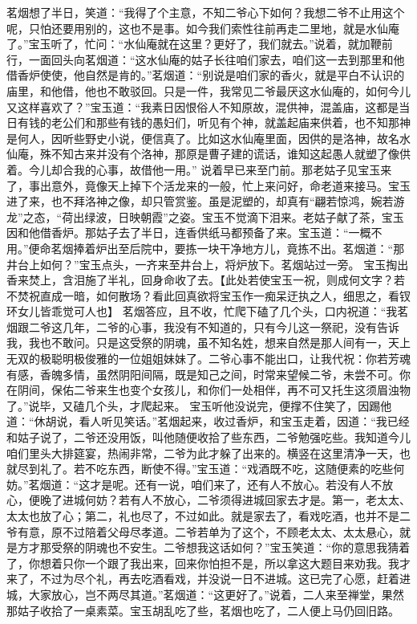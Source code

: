 \documentclass[12pt,oneside]{book}
\begin{document}
茗烟想了半日，笑道：“我得了个主意，不知二爷心下如何？我想二爷不止用这个呢，只怕还要用别的，这也不是事。如今我们索性往前再走二里地，就是水仙庵了。”宝玉听了，忙问：“水仙庵就在这里？更好了，我们就去。”说着，就加鞭前行，一面回头向茗烟道：“这水仙庵的姑子长往咱们家去，咱们这一去到那里和他借香炉使使，他自然是肯的。”茗烟道：“别说是咱们家的香火，就是平白不认识的庙里，和他借，他也不敢驳回。只是一件，我常见二爷最厌这水仙庵的，如何今儿又这样喜欢了？”宝玉道：“我素日因恨俗人不知原故，混供神，混盖庙，这都是当日有钱的老公们和那些有钱的愚妇们，听见有个神，就盖起庙来供着，也不知那神是何人，因听些野史小说，便信真了。比如这水仙庵里面，因供的是洛神，故名水仙庵，殊不知古来并没有个洛神，那原是曹子建的谎话，谁知这起愚人就塑了像供着。今儿却合我的心事，故借他一用。”
说着早已来至门前。那老姑子见宝玉来了，事出意外，竟像天上掉下个活龙来的一般，忙上来问好，命老道来接马。宝玉进了来，也不拜洛神之像，却只管赏鉴。虽是泥塑的，却真有“翩若惊鸿，婉若游龙”之态，“荷出绿波，日映朝霞”之姿。宝玉不觉滴下泪来。老姑子献了茶，宝玉因和他借香炉。那姑子去了半日，连香供纸马都预备了来。宝玉道：“一概不用。”便命茗烟捧着炉出至后院中，要拣一块干净地方儿，竟拣不出。茗烟道：“那井台上如何？”宝玉点头，一齐来至井台上，将炉放下。茗烟站过一旁。
宝玉掏出香来焚上，含泪施了半礼，回身命收了去。【此处若使宝玉一祝，则成何文字？若不焚祝直成一暗，如何散场？看此回真欲将宝玉作一痴呆迂执之人，细思之，看钗环女儿皆乖觉可人也】
茗烟答应，且不收，忙爬下磕了几个头，口内祝道：“我茗烟跟二爷这几年，二爷的心事，我没有不知道的，只有今儿这一祭祀，没有告诉我，我也不敢问。只是这受祭的阴魂，虽不知名姓，想来自然是那人间有一，天上无双的极聪明极俊雅的一位姐姐妹妹了。二爷心事不能出口，让我代祝：你若芳魂有感，香魄多情，虽然阴阳间隔，既是知己之间，时常来望候二爷，未尝不可。你在阴间，保佑二爷来生也变个女孩儿，和你们一处相伴，再不可又托生这须眉浊物了。”说毕，又磕几个头，才爬起来。
宝玉听他没说完，便撑不住笑了，因踢他道：“休胡说，看人听见笑话。”茗烟起来，收过香炉，和宝玉走着，因道：“我已经和姑子说了，二爷还没用饭，叫他随便收拾了些东西，二爷勉强吃些。我知道今儿咱们里头大排筵宴，热闹非常，二爷为此才躲了出来的。横竖在这里清净一天，也就尽到礼了。若不吃东西，断使不得。”宝玉道：“戏酒既不吃，这随便素的吃些何妨。”茗烟道：“这才是呢。还有一说，咱们来了，还有人不放心。若没有人不放心，便晚了进城何妨？若有人不放心，二爷须得进城回家去才是。第一，老太太、太太也放了心；第二，礼也尽了，不过如此。就是家去了，看戏吃酒，也并不是二爷有意，原不过陪着父母尽孝道。二爷若单为了这个，不顾老太太、太太悬心，就是方才那受祭的阴魂也不安生。二爷想我这话如何？”宝玉笑道：“你的意思我猜着了，你想着只你一个跟了我出来，回来你怕担不是，所以拿这大题目来劝我。我才来了，不过为尽个礼，再去吃酒看戏，并没说一日不进城。这已完了心愿，赶着进城，大家放心，岂不两尽其道。”茗烟道：“这更好了。”说着，二人来至禅堂，果然那姑子收拾了一桌素菜。宝玉胡乱吃了些，茗烟也吃了，二人便上马仍回旧路。
\end{document}
